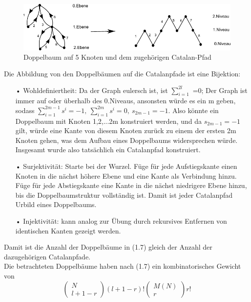 \documentclass[a4paper, 11pt]{scrreprt}
\begin{document}
\begin{figure}[htpb]
	\centering
	\includegraphics[width=1.00\textwidth]{Catalan-Pfad.pdf}
	\caption{Doppelbaum auf 5 Knoten und dem zugehörigen Catalan-Pfad} 
\end{figure}

Die Abbildung von den Doppelbäumen auf die Catalanpfade ist eine Bijektion:
\begin{itemize}
 \item[•]Wohldefiniertheit: Da der Graph eulersch ist, ist $ \sum_{i=1}^{2l} $ =0; Der Graph ist immer auf oder überhalb des 0.Niveaus, ansonsten würde es ein m geben, sodass $ \sum_{i=1}^{2m-1}s^{i}=-1, ~\sum_{i=1}^{2m}s^{i}=0, ~ s_{2m-1}=-1  $. Also könnte ein Doppelbaum mit Knoten {1,2,...2m} konstruiert werden, und da $ s_{2m-1}=-1  $ gilt, würde eine Kante von diesem Knoten zurück zu einem der ersten 2m Knoten gehen, was dem Aufbau eines Doppelbaums widersprechen würde. Insgesamt wurde also tatsächlich ein Catalanpfad konstruiert. 
 \item[•] Surjektivität: Starte bei der Wurzel. Füge für jede Aufstiegskante einen Knoten in die nächst höhere Ebene und eine Kante als Verbindung hinzu. Füge für jede Abstiegskante eine Kante in die nächst niedrigere Ebene hinzu, bis die Doppelbaumstruktur vollständig ist. Damit ist jeder Catalanpfad Urbild eines Doppelbaums. 
\item[•] Injektivität: kann analog zur Übung durch rekursives Entfernen von identischen Kanten gezeigt werden.\\
\end{itemize}
Damit ist die Anzahl der Doppelbäume in (1.7) gleich der Anzahl der dazugehörigen Catalanpfade.\\
Die betrachteten Doppelbäume haben nach (1.7) ein kombinatorisches Gewicht von 
	\begin{equation}
		\begin{pmatrix} N\\ l+1-r\end{pmatrix} (l+1-r)! \begin{pmatrix} M(N)\\r\end{pmatrix} r!
	\end{equation}
\end{document}
